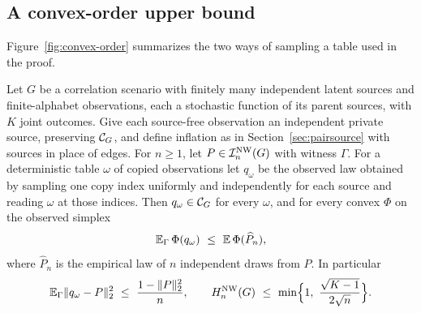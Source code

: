 \subsection{A convex-order upper bound}\label{sec:convexorder}

Figure~\ref{fig:convex-order} summarizes the two ways of sampling a table used in the proof.

\begin{theorem}\label{thm:convexorder}
Let $G$ be a correlation scenario with finitely many independent latent sources and finite-alphabet observations, each a stochastic function of its parent sources, with $K$ joint outcomes. Give each source-free observation an independent private source, preserving $\mathcal C_{G}$, and define inflation as in Section~\ref{sec:pairsource} with sources in place of edges. For $n\ge1$, let $P\in\mathcal I^{\mathrm{NW}}_n(G)$ with witness $\Gamma$. For a deterministic table $\omega$ of copied observations let $q_\omega$ be the observed law obtained by sampling one copy index uniformly and independently for each source and reading $\omega$ at those indices. Then $q_\omega\in\mathcal C_{G}$ for every $\omega$, and for every convex $\Phi$ on the observed simplex
\begin{equation}\label{eq:convexorder}
\mathbb E_\Gamma\,\Phi(q_\omega)\ \le\ \mathbb E\,\Phi(\widehat P_n),
\end{equation}
where $\widehat P_n$ is the empirical law of $n$ independent draws from $P$. In particular
\begin{equation}\label{eq:convexl2}
\mathbb E_\Gamma\|q_\omega-P\|_2^2\ \le\ \frac{1-\|P\|_2^2}{n},
\qquad
H^{\mathrm{NW}}_n(G)\ \le\ \min\Bigl\{1,\ \frac{\sqrt{K-1}}{2\sqrt n}\Bigr\}.
\end{equation}
\end{theorem}

